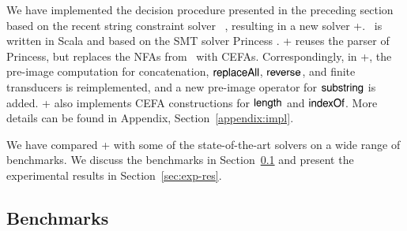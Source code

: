 
We have implemented the decision procedure presented in the preceding section based on the recent string constraint solver \ostrich~\cite{CHL+19}, resulting in a new solver \ostrich+. \ostrich\ is  written in Scala and based on the SMT solver Princess \cite{princess08}. \ostrich+ reuses the parser of Princess, but replaces the NFAs from \ostrich\ with CEFAs. Correspondingly, in \ostrich+, the pre-image  computation for concatenation, $\mathsf{replaceAll}$, $\mathsf{reverse}$, and finite transducers is reimplemented, and a new pre-image operator for $\mathsf{substring}$ is added. \ostrich+ also implements CEFA constructions for $\mathsf{length}$ and $\mathsf{indexOf}$.  More details can be found in Appendix, Section~\ref{appendix:impl}.

We have compared {\ostrich}+ with some of the state-of-the-art solvers on a wide range of benchmarks.  
We  discuss the benchmarks in Section~\ref{sec:bench} and %
present the experimental results in Section~\ref{sec:exp-res}.


\vspace{-3mm}
\subsection{Benchmarks}\label{sec:bench}
 

